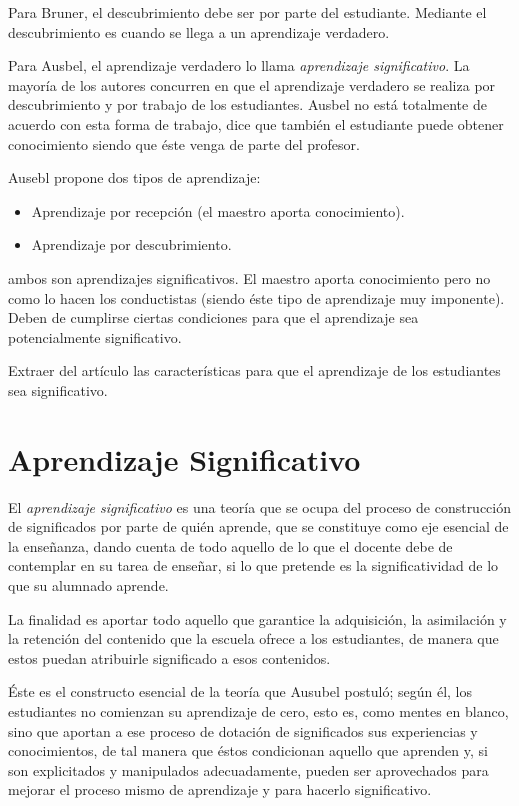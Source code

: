 \documentclass[12pt]{report}
\theoremstyle{largebreak}
\begin{document}
    Para Bruner, el descubrimiento debe ser por parte del estudiante. Mediante el descubrimiento es cuando se llega a un aprendizaje verdadero.

    Para Ausbel, el aprendizaje verdadero lo llama \textit{aprendizaje significativo}. La mayoría de los autores concurren en que el aprendizaje verdadero se realiza por descubrimiento y por trabajo de los estudiantes. Ausbel no está totalmente de acuerdo con esta forma de trabajo, dice que también el estudiante puede obtener conocimiento siendo que éste venga de parte del profesor.

    Ausebl propone dos tipos de aprendizaje:
    \begin{itemize}
        \item Aprendizaje por recepción (el maestro aporta conocimiento).
        \item Aprendizaje por descubrimiento.
    \end{itemize}
    ambos son aprendizajes significativos. El maestro aporta conocimiento pero no como lo hacen los conductistas (siendo éste tipo de aprendizaje muy imponente). Deben de cumplirse ciertas condiciones para que el aprendizaje sea potencialmente significativo.

    \begin{excer}
        Extraer del artículo las características para que el aprendizaje de los estudiantes sea significativo.
    \end{excer}

    \section{Aprendizaje Significativo}

    El \textit{aprendizaje significativo} es una teoría que se ocupa del proceso de construcción de significados por parte de quién aprende, que se constituye como eje esencial de la enseñanza, dando cuenta de todo aquello de lo que el docente debe de contemplar en su tarea de enseñar, si lo que pretende es la significatividad de lo que su alumnado aprende.
    
    La finalidad es aportar todo aquello que garantice la adquisición, la asimilación y la retención del contenido que la escuela ofrece a los estudiantes, de manera que estos puedan atribuirle significado a esos contenidos.

    Éste es el constructo esencial de la teoría que Ausubel postuló; según él, los
    estudiantes no comienzan su aprendizaje de cero, esto es, como mentes en blanco,
    sino que aportan a ese proceso de dotación de significados sus experiencias y
    conocimientos, de tal manera que éstos condicionan aquello que aprenden y, si son
    explicitados y manipulados adecuadamente, pueden ser aprovechados para mejorar el
    proceso mismo de aprendizaje y para hacerlo significativo. 
\end{document}
